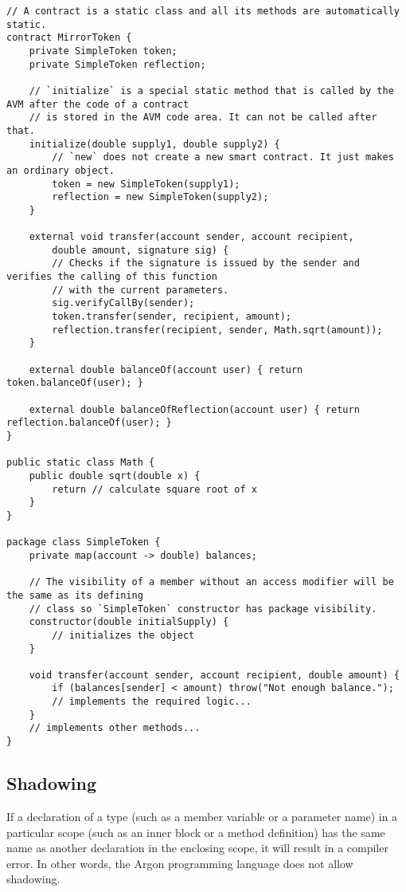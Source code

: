 \begin{lstlisting}[frame=TB, float, title=Argon contracts are static classes,label={lst:code1}]
// A contract is a static class and all its methods are automatically static.
contract MirrorToken {
    private SimpleToken token;
    private SimpleToken reflection;

    // `initialize` is a special static method that is called by the AVM after the code of a contract
    // is stored in the AVM code area. It can not be called after that.
    initialize(double supply1, double supply2) {
        // `new` does not create a new smart contract. It just makes an ordinary object.
        token = new SimpleToken(supply1);
        reflection = new SimpleToken(supply2);
    }

    external void transfer(account sender, account recipient,
        double amount, signature sig) {
        // Checks if the signature is issued by the sender and verifies the calling of this function
        // with the current parameters.
        sig.verifyCallBy(sender);
        token.transfer(sender, recipient, amount);
        reflection.transfer(recipient, sender, Math.sqrt(amount));
    }

    external double balanceOf(account user) { return token.balanceOf(user); }

    external double balanceOfReflection(account user) { return reflection.balanceOf(user); }
}

public static class Math {
    public double sqrt(double x) {
        return // calculate square root of x
    }
}

package class SimpleToken {
    private map(account -> double) balances;

    // The visibility of a member without an access modifier will be the same as its defining
    // class so `SimpleToken` constructor has package visibility.
    constructor(double initialSupply) {
        // initializes the object
    }

    void transfer(account sender, account recipient, double amount) {
        if (balances[sender] < amount) throw("Not enough balance.");
        // implements the required logic...
    }
    // implements other methods...
}
\end{lstlisting}

\subsection{Shadowing}\label{subsec:shadowing}

If a declaration of a type (such as a member variable or a parameter name) in a particular scope (such as an
inner block or a method definition) has the same name as another declaration in the enclosing scope, it will
result in a compiler error. In other words, the Argon programming language does not allow shadowing.

